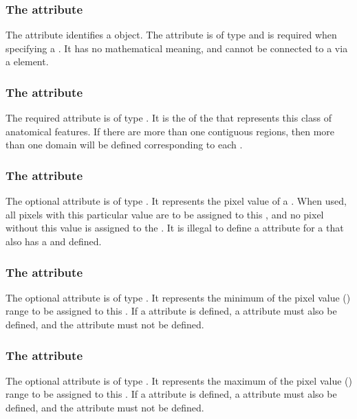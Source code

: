 \subsubsection{The \fixttspace{} attribute}
The  attribute identifies a \SampledVolume object. The attribute is of type  and is required when specifying a \SampledVolume.  It has no mathematical meaning, and cannot be connected to a \Parameter via a \SpatialSymbolReference element.

\subsubsection{The \fixttspace{} attribute}
The required  attribute is of type . It is the  of the \DomainType that represents this class of anatomical features. If there are more than one contiguous regions, then more than one domain will be defined corresponding to each \SampledVolume.

\subsubsection{The \fixttspace{} attribute}
The optional  attribute is of type . It represents the pixel value of a \SampledVolume.  When used, all pixels with this particular value are to be assigned to this \SampledVolume, and no pixel without this value is assigned to the \SampledVolume.  It is illegal to define a  attribute for a \SampledVolume that also has a  and  defined.

\subsubsection{The \fixttspace{} attribute}
The optional  attribute is of type . It represents the minimum of the pixel value () range to be assigned to this \SampledVolume.  If a  attribute is defined, a  attribute must also be defined, and the  attribute must not be defined.

\subsubsection{The \fixttspace{} attribute}
The optional  attribute is of type . It represents the maximum of the pixel value () range to be assigned to this \SampledVolume.  If a  attribute is defined, a  attribute must also be defined, and the  attribute must not be defined.


